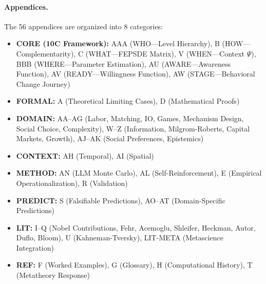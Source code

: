 \paragraph{Appendices.}
The 56 appendices are organized into 8 categories:

\begin{itemize}
    \item \textbf{CORE (10C Framework):} AAA (WHO---Level Hierarchy), B (HOW---Complementarity), C (WHAT---FEPSDE Matrix), V (WHEN---Context $\Psi$), BBB (WHERE---Parameter Estimation), AU (AWARE---Awareness Function), AV (READY---Willingness Function), AW (STAGE---Behavioral Change Journey)

    \item \textbf{FORMAL:} A (Theoretical Limiting Cases), D (Mathematical Proofs)

    \item \textbf{DOMAIN:} AA--AG (Labor, Matching, IO, Games, Mechanism Design, Social Choice, Complexity), W--Z (Information, Milgrom-Roberts, Capital Markets, Growth), AJ--AK (Social Preferences, Epistemics)

    \item \textbf{CONTEXT:} AH (Temporal), AI (Spatial)

    \item \textbf{METHOD:} AN (LLM Monte Carlo), AL (Self-Reinforcement), E (Empirical Operationalization), R (Validation)

    \item \textbf{PREDICT:} S (Falsifiable Predictions), AO--AT (Domain-Specific Predictions)

    \item \textbf{LIT:} I--Q (Nobel Contributions, Fehr, Acemoglu, Shleifer, Heckman, Autor, Duflo, Bloom), U (Kahneman-Tversky), LIT-META (Metascience Integration)

    \item \textbf{REF:} F (Worked Examples), G (Glossary), H (Computational History), T (Metatheory Response)
\end{itemize}

